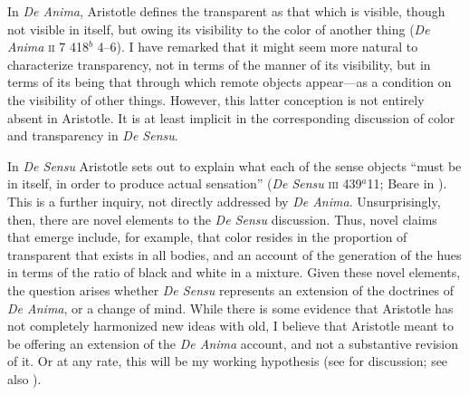 In \emph{De Anima}, Aristotle defines the transparent as that which is visible, though not visible in itself, but owing its visibility to the color of another thing (\emph{De Anima} \textsc{ii} 7 418\( ^{b} \) 4--6). I have remarked that it might seem more natural to characterize transparency, not in terms of the manner of its visibility, but in terms of its being that through which remote objects appear---as a condition on the visibility of other things. However, this latter conception is not entirely absent in Aristotle. It is at least implicit in the corresponding discussion of color and transparency in \emph{De Sensu}.

In \emph{De Sensu} Aristotle sets out to explain what each of the sense objects ``must be in itself, in order to produce actual sensation'' (\emph{De Sensu} \textsc{iii} 439\( ^{a} \)11; Beare in \citealt[7]{Barnes:1984uq}). This is a further inquiry, not directly addressed by \emph{De Anima}. Unsurprisingly, then, there are novel elements to the \emph{De Sensu} discussion. Thus, novel claims that emerge include, for example, that color resides in the proportion of transparent that exists in all bodies, and an account of the generation of the hues in terms of the ratio of black and white in a mixture. Given these novel elements, the question arises whether \emph{De Sensu} represents an extension of the doctrines of \emph{De Anima}, or a change of mind. While there is some evidence that Aristotle has not completely harmonized new ideas with old, I believe that Aristotle meant to be offering an extension of the \emph{De Anima} account, and not a substantive revision of it. Or at any rate, this will be my working hypothesis (see \citealt{Kahn:1966zr} for discussion; see also \citealt[291]{Caston:2005cr} \citealt[37]{Nussbaum:1995ly}).

